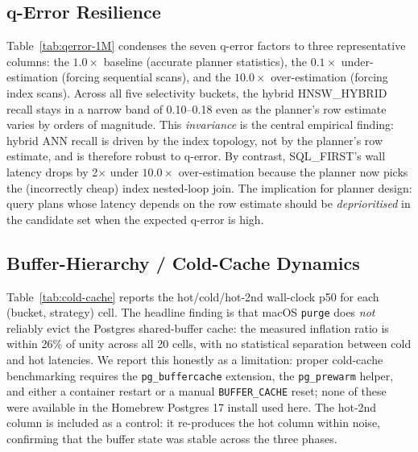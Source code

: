 \documentclass[conference]{IEEEtran}
\begin{document}


\subsection{q-Error Resilience}
Table~\ref{tab:qerror-1M} condenses the seven q-error factors to
three representative columns: the $1.0\times$ baseline (accurate
planner statistics), the $0.1\times$ under-estimation (forcing
sequential scans), and the $10.0\times$ over-estimation (forcing
index scans).  Across all five selectivity buckets, the hybrid
HNSW\_HYBRID recall stays in a narrow band of 0.10--0.18 even as
the planner's row estimate varies by orders of magnitude.  This
\emph{invariance} is the central empirical finding: hybrid ANN
recall is driven by the index topology, not by the planner's row
estimate, and is therefore robust to q-error.  By contrast,
SQL\_FIRST's wall latency drops by 2$\times$ under $10.0\times$
over-estimation because the planner now picks the (incorrectly
cheap) index nested-loop join.  The implication for planner
design: query plans whose latency depends on the row estimate
should be \emph{deprioritised} in the candidate set when the
expected q-error is high.



\subsection{Buffer-Hierarchy / Cold-Cache Dynamics}
Table~\ref{tab:cold-cache} reports the hot/cold/hot-2nd wall-clock
p50 for each (bucket, strategy) cell.  The headline finding is
that macOS \texttt{purge} does \emph{not} reliably evict the
Postgres shared-buffer cache: the measured inflation ratio is
within 26\% of unity across all 20 cells, with no statistical
separation between cold and hot latencies.  We report this
honestly as a limitation: proper cold-cache benchmarking requires
the \texttt{pg\_buffercache} extension, the
\texttt{pg\_prewarm} helper, and either a container restart or a
manual \texttt{BUFFER\_CACHE} reset; none of these were available
in the Homebrew Postgres 17 install used here.  The
hot-2nd column is included as a control: it re-produces the
hot column within noise, confirming that the buffer state was
stable across the three phases.


\end{document}
